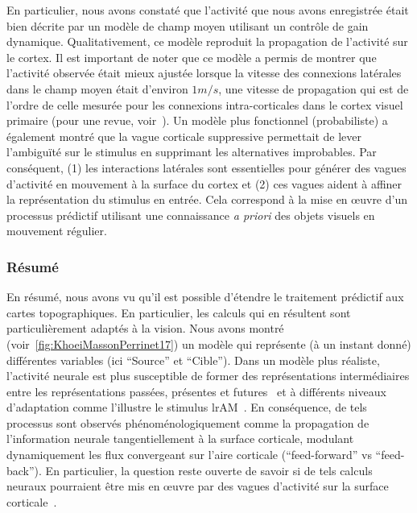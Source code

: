 En particulier, nous avons constaté que l'activité que nous avons
enregistrée était bien décrite par un modèle de champ moyen utilisant un
contrôle de gain dynamique. Qualitativement, ce modèle reproduit la
propagation de l'activité sur le cortex. Il est important de noter que
ce modèle a permis de montrer que l'activité observée était mieux
ajustée lorsque la vitesse des connexions latérales dans le champ moyen
était d'environ $1 m/s$, une vitesse de propagation qui est de l'ordre de
celle mesurée pour les connexions intra-corticales dans le cortex visuel
primaire (pour une revue, voir~\citep{Muller18}). Un modèle plus
fonctionnel (probabiliste) a également montré que la vague
corticale suppressive permettait de lever l'ambiguïté sur le stimulus en supprimant
les alternatives improbables. Par conséquent,
(1) les interactions latérales sont essentielles pour générer des vagues d'activité
en mouvement à la surface du cortex et (2) ces vagues aident à affiner la représentation
du stimulus en entrée. Cela correspond à la mise en œuvre d'un processus
prédictif utilisant une connaissance \emph{a priori} des objets visuels
en mouvement régulier.

\subsubsection{Résumé}
En résumé, nous avons vu qu'il est possible d'étendre le traitement
prédictif aux cartes topographiques. En particulier, les calculs qui en
résultent sont particulièrement adaptés à la vision. Nous avons montré
(voir~\ref{fig:KhoeiMassonPerrinet17}) un modèle qui représente (à un instant donné) différentes
variables (ici ``Source'' et ``Cible''). Dans un modèle plus réaliste,
l'activité neurale est plus susceptible de former des représentations
intermédiaires entre les représentations passées, présentes et futures~\citep{Glaser18} et à différents niveaux d'adaptation comme
l'illustre le stimulus lrAM~\citep{Chemla19}. En conséquence, de
tels processus sont observés phénoménologiquement comme la propagation
de l'information neurale tangentiellement à la surface corticale,
modulant dynamiquement les flux convergeant sur l'aire corticale (``feed-forward'' vs ``feed-back''). En
particulier, la question reste ouverte de savoir si de tels calculs
neuraux pourraient être mis en œuvre par des vagues d'activité sur la
surface corticale~\citep{Muller18}.

